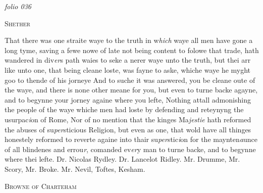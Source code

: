 \documentclass[12pt, a4paper]{book}
\begin{document}
\textit{folio 036}


            
            	
				\begin{center} \begin{large} {\scshape Shether} \end{large} \end{center}
			

            	
            		
				\marginpar[\vspace{0.5cm}{\textcolor{Gray}{Seditious}}]{}
			
            		
				\marginpar[\vspace{0.5cm}{\textcolor{Gray}{n}}]{}
			
            		
		\ifthenelse{\isodd{\thepage}}
		{\reversemarginpar}
		{\normalmarginpar}
		That there was one straite waye to the truth in w\textit{hich} waye
 all men have gone a long tyme, saving a fewe nowe of late
 not being content to folowe that trade, hath wandered in div\textit{er}s
 path waies to seke a nerer waye unto the truth, but
 thei arr like unto one, that being cleane loste, was fayne
 to aske, whiche waye he myght goo to thende of his jorneye
 And to suche it was answered, you be cleane oute of the
 waye, and there is none other meane for you, but even to
 turne backe agayne, and to begynne your jorney againe
 where you lefte, Nothing attall admonishing the people of
 the waye whiche men had loste by defending and reteynyng
 the usurpac\textit{i}on of Rome, Nor of no mention that the kinges
 Ma\textit{jestie} hath reformed the abuses of su\textit{per}sticious Religion, but
 even as one, that wold have all thinges honestely reformed
 to reverte againe into thair su\textit{per}stic\textit{i}on for the maynten\textit{a}unce
 of all blindenes and errou\textit{r}, comanded ev\textit{er}y man to turne
 backe, and to begynne where thei lefte. Dr. Nicolas Rydley.
            			Dr. Lancelot Ridley. Mr. Drumme, Mr. Scory, Mr. Broke. Mr.
 Nevil, Toftes, Kesham.


            
               
				\begin{center} \begin{large} {\scshape Browne of Charteham} \end{large} \end{center}
			
            	
			
				\marginpar[\vspace{0.5cm}{\textcolor{Gray}{n}}]{}
			
\end{document}
